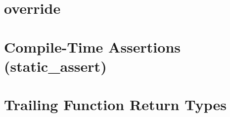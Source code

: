 \section[{\tt override}\hspace*{1em}(Long Title)]{{\SecCode override}}\label{override}


\newpage
\section[{\tt static\_assert}\hspace*{1em}(Compile-Time Assertions)]{Compile-Time Assertions ({\SecCode static\_assert})}\label{compile-time-assertions-(static_assert)}


\newpage
\section[Short Title\hspace*{1em}(Trailing Function Return Types)]{Trailing Function Return Types}\label{trailing-function-return-types}


\newpage
